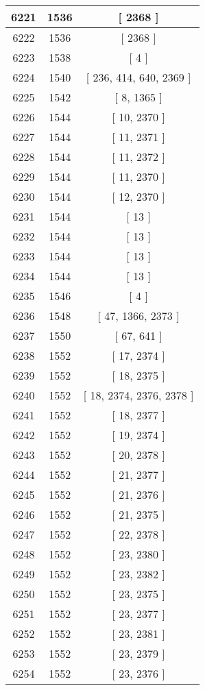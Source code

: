 \begin{center}
\begin{longtable}[H]{|| c c c ||}
\hline
6221 & 1536 & [ 2368 ] \\ 
\hline
6222 & 1536 & [ 2368 ] \\ 
\hline
6223 & 1538 & [ 4 ] \\ 
\hline
6224 & 1540 & [ 236, 414, 640, 2369 ] \\ 
\hline
6225 & 1542 & [ 8, 1365 ] \\ 
\hline
6226 & 1544 & [ 10, 2370 ] \\ 
\hline
6227 & 1544 & [ 11, 2371 ] \\ 
\hline
6228 & 1544 & [ 11, 2372 ] \\ 
\hline
6229 & 1544 & [ 11, 2370 ] \\ 
\hline
6230 & 1544 & [ 12, 2370 ] \\ 
\hline
6231 & 1544 & [ 13 ] \\ 
\hline
6232 & 1544 & [ 13 ] \\ 
\hline
6233 & 1544 & [ 13 ] \\ 
\hline
6234 & 1544 & [ 13 ] \\ 
\hline
6235 & 1546 & [ 4 ] \\ 
\hline
6236 & 1548 & [ 47, 1366, 2373 ] \\ 
\hline
6237 & 1550 & [ 67, 641 ] \\ 
\hline
6238 & 1552 & [ 17, 2374 ] \\ 
\hline
6239 & 1552 & [ 18, 2375 ] \\ 
\hline
6240 & 1552 & [ 18, 2374, 2376, 2378 ] \\ 
\hline
6241 & 1552 & [ 18, 2377 ] \\ 
\hline
6242 & 1552 & [ 19, 2374 ] \\ 
\hline
6243 & 1552 & [ 20, 2378 ] \\ 
\hline
6244 & 1552 & [ 21, 2377 ] \\ 
\hline
6245 & 1552 & [ 21, 2376 ] \\ 
\hline
6246 & 1552 & [ 21, 2375 ] \\ 
\hline
6247 & 1552 & [ 22, 2378 ] \\ 
\hline
6248 & 1552 & [ 23, 2380 ] \\ 
\hline
6249 & 1552 & [ 23, 2382 ] \\ 
\hline
6250 & 1552 & [ 23, 2375 ] \\ 
\hline
6251 & 1552 & [ 23, 2377 ] \\ 
\hline
6252 & 1552 & [ 23, 2381 ] \\ 
\hline
6253 & 1552 & [ 23, 2379 ] \\ 
\hline
6254 & 1552 & [ 23, 2376 ] \\ 

\end{longtable}
\end{center}
